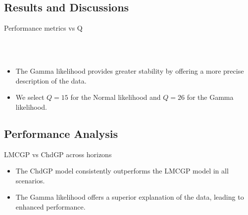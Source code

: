 \subsection{Results and Discussions}

\begin{frame}{Performance metrics vs Q}
	\vspace{-0.8em}
	\begin{figure}[htbp]
		\tiny
		\centering
		\setlength{} 
		\setlength{}
		\subfloat[MSE]{}
		\subfloat[MSLL]{}\\
		\vspace{-1.0em}
		\subfloat[CRPS]{}
		\subfloat[NLPD]{}\\
	\end{figure}
	\vspace{-1.5em}
\begin{itemize}
	\item The Gamma likelihood provides greater stability by offering a more precise description of the data.
	\item We select $Q=15$ for the Normal likelihood and $Q=26$ for the Gamma likelihood.
\end{itemize}

\end{frame}

\subsection{Performance Analysis}
\begin{frame}{LMCGP vs ChdGP across horizons}
	\begin{figure}[htbp]
		\centering
		\tiny
		\setlength{}
		\setlength{}
		
		\subfloat[MSLL]{}
		\hfill
		\subfloat[NLPD]{}
	\end{figure}
	\vspace{-2.0em}
\begin{itemize}
	\item The ChdGP model consistently outperforms the LMCGP model in all scenarios.
	\item The Gamma likelihood offers a superior explanation of the data, leading to enhanced performance.
\end{itemize}

\end{frame}

